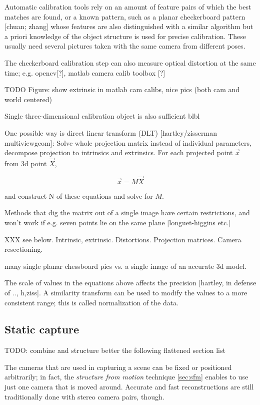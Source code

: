 Automatic calibration tools rely on an amount of feature pairs of which the best matches are found, or a known pattern, such as a planar checkerboard pattern [chuan; zhang] whose features are also distinguished with a similar algorithm but a priori knowledge of the object structure is used for precise calibration.
These usually need several pictures taken with the same camera from different poses.

The checkerboard calibration step can also measure optical distortion at the same time; e.g. opencv[?], matlab camera calib toolbox [?]

TODO Figure: show extrinsic in matlab cam calibs, nice pics (both cam and world centered)

Single three-dimensional calibration object is also sufficient blbl

One possible way is direct linear transform (DLT) [hartley/zisserman multiviewgeom]: Solve whole projection matrix instead of individual parameters, decompose projection to intrinsics and extrinsics. For each projected point $\vec x$ from 3d point $\vec X$,

\[
	\vec x = M \vec X
\]

and construct N of these equations and solve for $M$.

Methods that dig the matrix out of a single image have certain restrictions, and won't work if e.g. seven points lie on the same plane [longuet-higgins etc.]

XXX see below. Intrinsic, extrinsic. Distortions. Projection matrices. Camera resectioning.

many single planar chessboard pics vs. a single image of an accurate 3d model.

The scale of values in the equations above affects the precision [hartley, in defense of .., h,ziss]. A similarity transform can be used to modify the values to a more consistent range; this is called normalization of the data.

\subsection{Static capture}

TODO: combine and structure better the following flattened section list

The cameras that are used in capturing a scene can be fixed or positioned arbitrarily; in fact, the \textit{structure from motion} technique \ref{sec:sfm} enables to use just one camera that is moved around. Accurate and fast reconstructions are still traditionally done with stereo camera pairs, though.

